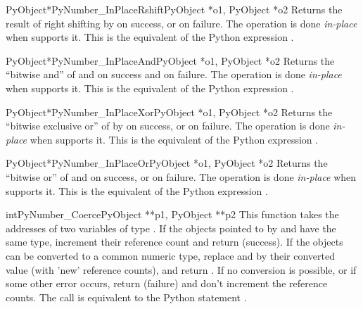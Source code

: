 \documentclass{manual}
\begin{document}
\begin{cfuncdesc}{PyObject*}{PyNumber_InPlaceRshift}{PyObject *o1, PyObject *o2}
Returns the result of right shifting  by  on success, or
\NULL{} on failure.  The operation is done \emph{in-place} when 
supports it.  This is the equivalent of the Python expression .
\end{cfuncdesc}


\begin{cfuncdesc}{PyObject*}{PyNumber_InPlaceAnd}{PyObject *o1, PyObject *o2}
Returns the ``bitwise and'' of  and  on success
and \NULL{} on failure. The operation is done \emph{in-place} when
 supports it.  This is the equivalent of the Python expression
.
\end{cfuncdesc}


\begin{cfuncdesc}{PyObject*}{PyNumber_InPlaceXor}{PyObject *o1, PyObject *o2}
Returns the ``bitwise exclusive or'' of  by  on success, or
\NULL{} on failure.  The operation is done \emph{in-place} when 
supports it.  This is the equivalent of the Python expression .
\end{cfuncdesc}

\begin{cfuncdesc}{PyObject*}{PyNumber_InPlaceOr}{PyObject *o1, PyObject *o2}
Returns the ``bitwise or'' of  and  on success, or \NULL{}
on failure.  The operation is done \emph{in-place} when  supports
it.  This is the equivalent of the Python expression .
\end{cfuncdesc}

\begin{cfuncdesc}{int}{PyNumber_Coerce}{PyObject **p1, PyObject **p2}
This function takes the addresses of two variables of type
.  If the objects pointed to by  and
 have the same type, increment their reference count
and return  (success). If the objects can be converted to a
common numeric type, replace  and  by their
converted value (with 'new' reference counts), and return .
If no conversion is possible, or if some other error occurs, return
 (failure) and don't increment the reference counts.  The
call  is equivalent to the Python
statement .
\end{cfuncdesc}
\end{document}
